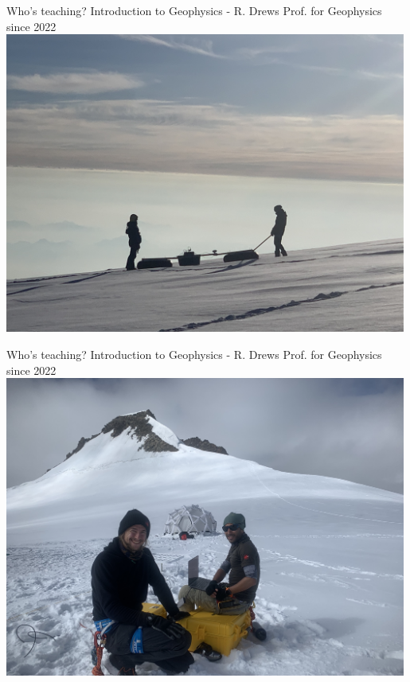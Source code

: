 \begin{frame}
    \begin{PointSix}{Who's teaching?}
        \alert{Introduction to Geophysics - R. Drews}
        \small Prof. for Geophysics since 2022
        \includegraphics[width=0.99\textwidth]{Figures/General/FieldPhotos/GPRColle.png}
      \end{PointSix}
\end{frame}

\begin{frame}
    \begin{PointSix}{Who's teaching?}
        \alert{Introduction to Geophysics - R. Drews}
        \small Prof. for Geophysics since 2022
        \includegraphics[width=0.99\textwidth]{Figures/General/FieldPhotos/GPRColle2.png}
      \end{PointSix}
\end{frame}

